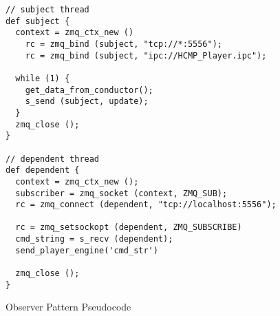 \begin{table}[htdp]
\centering
\begin{lstlisting}
// subject thread 
def subject {
  context = zmq_ctx_new ()
	rc = zmq_bind (subject, "tcp://*:5556");
	rc = zmq_bind (subject, "ipc://HCMP_Player.ipc");

  while (1) {
    get_data_from_conductor();
    s_send (subject, update);
  }
  zmq_close ();
}

// dependent thread 
def dependent {
  context = zmq_ctx_new ();
  subscriber = zmq_socket (context, ZMQ_SUB);
  rc = zmq_connect (dependent, "tcp://localhost:5556");

  rc = zmq_setsockopt (dependent, ZMQ_SUBSCRIBE)
  cmd_string = s_recv (dependent);
  send_player_engine('cmd_str')

  zmq_close ();
}

\end{lstlisting}
\caption[Observer Pattern Pseudocode]{Observer Pattern Pseudocode}
\end{table}

